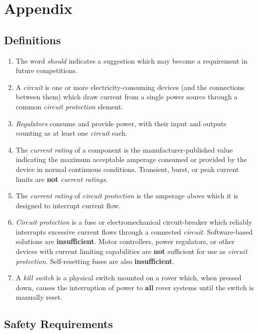     \clearpage

\section{Appendix}

    \subsection{Definitions}

    \begin{enumerate}
        \item The word \textit{should} indicates a suggestion which may become a requirement in future competitions.
        \item A \textit{circuit} is one or more electricity-consuming devices (and the connections between them) which draw current from a single power source through a common \textit{circuit protection} element.
        \item \textit{Regulators} consume and provide power, with their input and outputs counting as at least one \textit{circuit} each.
        \item The \textit{current rating} of a component is the manufacturer-published value indicating the maximum acceptable amperage consumed or provided by the device in normal continuous conditions. Transient, burst, or peak current limits are \textbf{not} \textit{current ratings}.
        \item The \textit{current rating} of \textit{circuit protection} is the amperage above which it is designed to interrupt current flow.
        \item \textit{Circuit protection} is a fuse or electromechanical circuit-breaker which reliably interrupts excessive current flows through a connected \textit{circuit}. Software-based solutions are \textbf{insufficient}. Motor controllers, power regulators, or other devices with current limiting capabilities are \textbf{not} sufficient for use as \textit{circuit protection}. Self-resetting fuses are also \textbf{insufficient}.
        \item A \textit{kill switch} is a physical switch mounted on a rover which, when pressed down, causes the interruption of power to \textbf{all} rover systems until the switch is manually reset.
    \end{enumerate}

    \clearpage

    \subsection{Safety Requirements}
    


